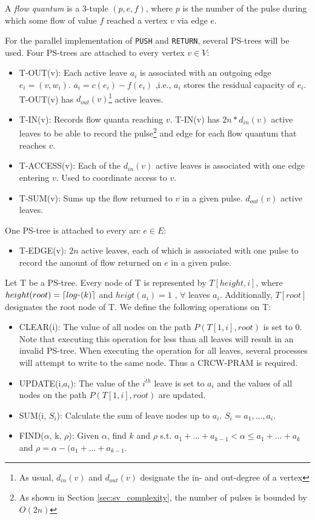 \documentclass[a4paper,10pt, twocolumn]{article}
\begin{document}
A \emph{flow quantum} is a 3-tuple $(p, e, f)$, where $p$ is the number of the pulse during which some flow of value $f$ reached a vertex $v$ via edge $e$.

For the parallel implementation of \lstinline|PUSH| and \lstinline|RETURN|, several PS-trees will be used. Four PS-trees are attached to every vertex $v \in V$:
\begin{itemize}
	\item T-OUT(v): Each active leave $a_i$ is associated with an outgoing edge $e_i = (v, w_i)$. $a_i = c(e_i) - f(e_i)$ ,i.e., $a_i$ stores the residual capacity of $e_i$. T-OUT(v) has $d_{out}(v)$\footnote{As usual, $d_{in}(v)$ and $d_{out}(v)$ designate the in- and out-degree of a vertex} active leaves.
	\item T-IN(v): Records flow quanta reaching $v$. T-IN(v) has $2n*d_{in}(v)$ active leaves to be able to record the pulse\footnote{As shown in Section \ref{sec:sv_complexity}, the number of pulses is bounded by $O(2n)$} and edge for each flow quantum that reaches $v$. 
	\item T-ACCESS(v): Each of the $d_{in}(v)$ active leaves is associated with one edge entering $v$. Used to coordinate access to $v$.
	\item T-SUM(v): Sums up the flow returned to $v$ in a given pulse. $d_{out}(v)$ active leaves. 
\end{itemize}
One PS-tree is attached to every arc $e \in E$:
\begin{itemize}
	\item T-EDGE(v): $2n$ active leaves, each of which is associated with one pulse to record the amount of flow returned on $e$ in a given pulse.
\end{itemize}

Let T be a PS-tree. Every node of T is represented by $T[height, i]$, where $height(root) = \lceil log_"(k) \rceil$ and $heigt(a_i) = 1$ , $\forall$ leaves $a_i$. Additionally, $T[root]$ designates the root node of T. We define the following operations on T:
\begin{itemize}
	\item CLEAR(i): The value of all nodes on the path $P(T[1,i],root)$ is set to 0. Note that executing this operation for less than all leaves will result in an invalid PS-tree. When executing the operation for all leaves, several processes will attempt to write to the same node. Thus a CRCW-PRAM is required.
	\item UPDATE(i,$a_i$): The value of the $i^{th}$ leave is set to $a_i$ and the values of all nodes on the path $P(T[1,i],root)$ are updated.
	\item SUM(i, $S_i$): Calculate the sum of leave nodes up to $a_i$. $S_i = a_1,...,a_i$.
	\item FIND($\alpha$, k, $\rho$): Given $\alpha$, find $k$ and $\rho$ s.t. $a_1+...+a_{k-1} < \alpha \leq a_1+...+a_k$ and $\rho = \alpha - (a_1+...+a_{k-1}$.
\end{itemize}  
\end{document}
